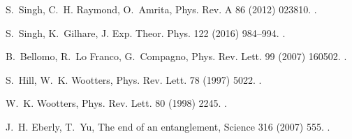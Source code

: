 \documentclass[twocolumn,3p,times]{elsarticle}
\begin{document}
\begin{thebibliography}{10}
S.~Singh, C.~H. Raymond, O.~Amrita, Phys. Rev. A 86 (2012) 023810.
\newblock \href {http://dx.doi.org/10.1103/PhysRevA.86.023810}
  {}.

S.~Singh, K.~Gilhare, J. Exp. Theor. Phys. 122 (2016) 984–994.
\newblock \href {http://dx.doi.org/10.1134/S1063776116050216}
  {}.

B.~Bellomo, R.~{Lo Franco}, G.~Compagno, Phys. Rev. Lett. 99 (2007) 160502.
\newblock \href {http://dx.doi.org/10.1103/PhysRevLett.99.160502}
  {}.

S.~Hill, W.~K. Wootters, Phys. Rev. Lett. 78 (1997) 5022.
\newblock \href {http://dx.doi.org/10.1103/PhysRevLett.78.5022}
  {}.

W.~K. Wootters, Phys. Rev. Lett. 80 (1998) 2245.
\newblock \href {http://dx.doi.org/10.1103/PhysRevLett.80.2245}
  {}.

J.~H. Eberly, T.~Yu, The end of an entanglement, Science 316 (2007) 555.
\newblock \href {http://dx.doi.org/10.1126/science.1142654}
  {}.

\end{thebibliography}
\end{document}
